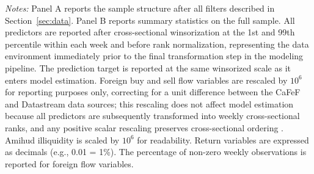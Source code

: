 \begin{table}[ht]
\begin{minipage}{0.95\textwidth}
\textit{Notes:} Panel A reports the sample structure after all filters described in Section~\ref{sec:data}. Panel B reports summary statistics on the full sample. All predictors are reported after cross-sectional winsorization at the 1st and 99th percentile within each week and before rank normalization, representing the data environment immediately prior to the final transformation step in the modeling pipeline. The prediction target is reported at the same winsorized scale as it enters model estimation. Foreign buy and sell flow variables are rescaled by $10^6$ for reporting purposes only, correcting for a unit difference between the CaFeF and Datastream data sources; this rescaling does not affect model estimation because all predictors are subsequently transformed into weekly cross-sectional ranks, and any positive scalar rescaling preserves cross-sectional ordering \citep{gu_2020_empirical}. Amihud illiquidity is scaled by $10^6$ for readability. Return variables are expressed as decimals (e.g., 0.01 = 1\%). The percentage of non-zero weekly observations is reported for foreign flow variables.
\end{minipage}
\end{table}